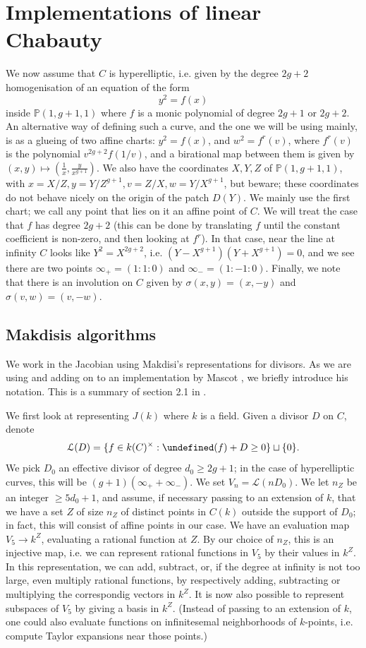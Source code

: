 \documentclass[12pt]{article}
\newcommand{\Lcal}{\mathcal{L}}
\renewcommand{\P}{\mathbb{P}}
\let\div\undefined
\DeclareMathOperator{\div}{div}
\theoremstyle{plain}
\theoremstyle{definition}
\theoremstyle{remark}
\begin{document}
\section{Implementations of linear Chabauty}
\label{section:explicit}
We now assume that $C$ is hyperelliptic, i.e. given by the degree $2g+2$ homogenisation of an equation of the form
\[
y^2 = f(x)
\]
inside $\P(1,g+1,1)$ where $f$ is a monic polynomial of degree $2g+1$ or $2g+2$. An alternative way of defining such a curve, and the one we will be using mainly, is as a glueing of two affine charts: $y^2 = f(x)$, and $w^2 = f^{r}(v)$, where $f^{r}(v)$ is the polynomial $v^{2g + 2} f(1/v)$, and a birational map between them is given by $(x,y) \mapsto (\frac{1}{x},\frac{y}{x^{g+1}})$. We also have the coordinates $X,Y,Z$ of $\P(1,g+1,1)$, with $x = X/Z, y = Y/Z^{g+1}, v = Z/X, w = Y/X^{g+1}$, but beware; these coordinates do not behave nicely on the origin of the patch $D(Y)$. We mainly use the first chart; we call any point that lies on it an affine point of $C$. We will treat the case that $f$ has degree $2g+2$ (this can be done by translating $f$ until the constant coefficient is non-zero, and then looking at $f^r$). In that case, near the line at infinity $C$ looks like $Y^2 = X^{2g+2}$, i.e. $(Y-X^{g+1})(Y+X^{g+1}) = 0$, and we see there are two points $\infty_+ = (1:1:0)$ and $\infty_- = (1:-1:0)$. Finally, we note that there is an involution on $C$ given by $\sigma(x,y) = (x,-y)$ and $\sigma(v,w) = (v,-w)$.

\subsection{Makdisis algorithms}
We work in the Jacobian using Makdisi's representations for divisors. As we are using and adding on to an implementation by Mascot \cite{mascot18}, we briefly introduce his notation. This is a summary of section 2.1 in \cite{mascot18}.

We first look at representing $J(k)$ where $k$ is a field. Given a divisor $D$ on $C$, denote
\[
\Lcal(D) = \{f \in k(C)^\times : \div(f) + D \geq 0 \} \sqcup \{0\}.
\]
We pick $D_0$ an effective divisor of degree $d_0 \geq 2g+1$; in the case of hyperelliptic curves, this will be $(g+1)(\infty_+ + \infty_-)$. We set $V_n = \Lcal(nD_0)$. We let $n_Z$ be an integer $\geq 5d_0 + 1$, and assume, if necessary passing to an extension of $k$, that we have a set $Z$ of size $n_Z$ of distinct points in $C(k)$ outside the support of $D_0$; in fact, this will consist of affine points in our case. We have an evaluation map $V_5 \to k^Z$, evaluating a rational function at $Z$. By our choice of $n_Z$, this is an injective map, i.e. we can represent rational functions in $V_5$ by their values in $k^Z$. In this representation, we can add, subtract, or, if the degree at infinity is not too large, even multiply rational functions, by respectively adding, subtracting or multiplying the correspondig vectors in $k^Z$. It is now also possible to represent subspaces of $V_5$ by giving a basis in $k^Z$. (Instead of passing to an extension of $k$, one could also evaluate functions on infinitesemal neighborhoods of $k$-points, i.e. compute Taylor expansions near those points.)
\end{document}
